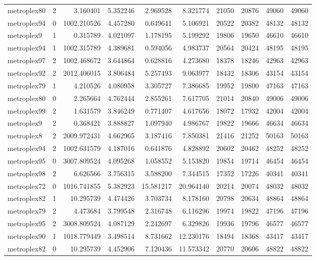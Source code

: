 \begin{longtable}{|l|r|r|r|r|r|r|r|r|r|}
metroplex80 & 2 & 3.160401 & 5.352246 & 2.969528 & 8.321774 & 21050 & 20876 & 49060 & 49060 \\
metroplex94 & 0 & 1002.210526 & 4.457280 & 0.649641 & 5.106921 & 20522 & 20382 & 48132 & 48132 \\
metroplex9 & 1 & 0.315789 & 4.021097 & 1.178195 & 5.199292 & 19806 & 19650 & 46610 & 46610 \\
metroplex94 & 1 & 1002.315789 & 4.389681 & 0.594056 & 4.983737 & 20564 & 20424 & 48195 & 48195 \\
metroplex97 & 2 & 1002.468672 & 3.644864 & 0.628816 & 4.273680 & 18378 & 18246 & 42963 & 42963 \\
metroplex92 & 2 & 2012.406015 & 3.806484 & 5.257493 & 9.063977 & 18432 & 18306 & 43154 & 43154 \\
metroplex79 & 1 & 4.210526 & 4.080958 & 3.305727 & 7.386685 & 19952 & 19800 & 47163 & 47163 \\
metroplex80 & 0 & 2.265664 & 4.762444 & 2.855261 & 7.617705 & 21014 & 20840 & 49006 & 49006 \\
metroplex99 & 2 & 1.631579 & 3.846249 & 0.771407 & 4.617656 & 18072 & 17932 & 42004 & 42004 \\
metroplex9 & 2 & 0.368421 & 3.888827 & 1.097940 & 4.986767 & 19822 & 19666 & 46634 & 46634 \\
metroplex8 & 2 & 2009.972431 & 4.662965 & 3.187416 & 7.850381 & 21416 & 21252 & 50163 & 50163 \\
metroplex94 & 2 & 1002.631579 & 4.187016 & 0.641876 & 4.828892 & 20602 & 20462 & 48252 & 48252 \\
metroplex95 & 0 & 3007.809524 & 4.095268 & 1.058552 & 5.153820 & 19854 & 19714 & 46454 & 46454 \\
metroplex98 & 2 & 6.626566 & 3.756315 & 3.588200 & 7.344515 & 17352 & 17226 & 40341 & 40341 \\
metroplex72 & 0 & 1016.741855 & 5.382923 & 15.581217 & 20.964140 & 20214 & 20074 & 48032 & 48032 \\
metroplex82 & 1 & 10.295739 & 4.474426 & 3.703734 & 8.178160 & 20798 & 20634 & 48864 & 48864 \\
metroplex79 & 2 & 4.473684 & 3.799548 & 2.316748 & 6.116296 & 19974 & 19822 & 47196 & 47196 \\
metroplex95 & 2 & 3008.809524 & 4.087129 & 2.242697 & 6.329826 & 19936 & 19796 & 46577 & 46577 \\
metroplex90 & 1 & 1018.779449 & 3.498514 & 8.731662 & 12.230176 & 18494 & 18368 & 43417 & 43417 \\
metroplex82 & 0 & 10.295739 & 4.452906 & 7.120436 & 11.573342 & 20770 & 20606 & 48822 & 48822 \\

\end{longtable}
